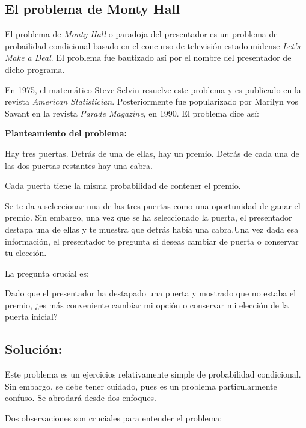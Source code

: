 \subsection{El problema de Monty Hall}

El problema de \textit{Monty Hall} o paradoja del presentador es un problema de
probailidad condicional basado en el concurso de televisi\'on estadounidense
\textit{Let's Make a Deal}. El problema fue bautizado as\'i por el nombre del
presentador de dicho programa.

En 1975, el matem\'atico Steve Selvin resuelve este problema y es publicado en
la revista \textit{American Statistician}. Posteriormente fue popularizado por
Marilyn vos Savant en la revista \textit{Parade Magazine}, en 1990. El problema
dice as\'i:

\textbf{Planteamiento del problema:}

Hay tres puertas. Detr\'as de una de ellas, hay un premio. Detr\'as de cada una
de las dos puertas restantes hay una cabra.

Cada puerta tiene la misma probabilidad de contener el premio.

Se te da a seleccionar una de las tres puertas como una oportunidad de ganar el
premio. Sin embargo, una vez que se ha seleccionado la puerta, el presentador
destapa una de ellas y te muestra que detrás hab\'ia una cabra.Una vez dada esa
informaci\'on, el presentador te pregunta si deseas cambiar de puerta o
conservar tu elecci\'on.

La pregunta crucial es:

Dado que el presentador ha destapado una puerta y mostrado que no estaba el
premio, ¿es m\'as conveniente cambiar mi opci\'on o conservar mi elecci\'on de
la puerta inicial?


\subsection{Soluci\'on:}
Este problema es un ejercicios relativamente simple de probabilidad condicional.
Sin embargo, se debe tener cuidado, pues es un problema particularmente confuso.
Se abrodará desde dos enfoques.

Dos observaciones son cruciales para entender el problema:

